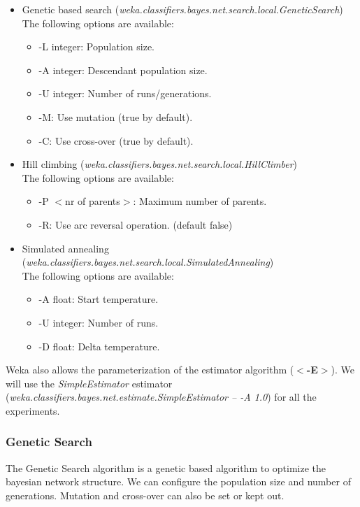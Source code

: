 \documentclass[a4paper]{llncs}
\begin{document}
\begin{itemize}
  \item Genetic based search (\textit{weka.classifiers.bayes.net.search.local.GeneticSearch}) \\
  The following options are available:
  \begin{itemize}
    \item -L integer: Population size. 
    \item -A integer: Descendant population size.
    \item -U integer: Number of runs/generations.
    \item -M: Use mutation (true by default).
    \item -C: Use cross-over (true by default).
  \end{itemize}
  
  \item Hill climbing (\textit{weka.classifiers.bayes.net.search.local.HillClimber}) \\
  The following options are available:
  \begin{itemize}
    \item -P $<$nr of parents$>$: Maximum number of parents.
    \item -R: Use arc reversal operation. (default false)
  \end{itemize}
  
  \item Simulated annealing (\textit{weka.classifiers.bayes.net.search.local.SimulatedAnnealing}) \\
  The following options are available:
  \begin{itemize}
    \item -A float: Start temperature.
    \item -U integer: Number of runs.
    \item -D float: Delta temperature.
  \end{itemize}
\end{itemize}

Weka also allows the parameterization of the estimator algorithm (\textbf{$<$-E$>$}).
We will use the \textit{SimpleEstimator} estimator (\textit{weka.classifiers.bayes.net.estimate.SimpleEstimator -- -A 1.0})
for all the experiments.

\subsubsection{Genetic Search}

The Genetic Search algorithm is a genetic based algorithm to optimize the bayesian network structure.
We can configure the population size and number of generations. Mutation and cross-over can also
be set or kept out.
\end{document}
